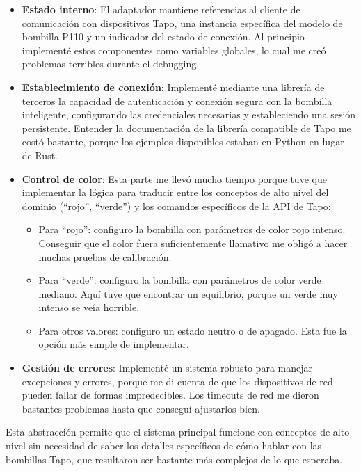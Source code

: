 \begin{itemize}
    \item \textbf{Estado interno}: El adaptador mantiene referencias al cliente de comunicación con dispositivos Tapo, una instancia específica del modelo de bombilla P110 y un indicador del estado de conexión. Al principio implementé estos componentes como variables globales, lo cual me creó problemas terribles durante el debugging.
    
    \item \textbf{Establecimiento de conexión}: Implementé mediante una librería de terceros la capacidad de autenticación y conexión segura con la bombilla inteligente, configurando las credenciales necesarias y estableciendo una sesión persistente. Entender la documentación de la librería compatible de Tapo me costó bastante, porque los ejemplos disponibles estaban en Python en lugar de Rust.
    
    \item \textbf{Control de color}: Esta parte me llevó mucho tiempo porque tuve que implementar la lógica para traducir entre los conceptos de alto nivel del dominio (\textquotedblleft rojo\textquotedblright{}, \textquotedblleft verde\textquotedblright{}) y los comandos específicos de la API de Tapo:
    \begin{itemize}
        \item Para \textquotedblleft rojo\textquotedblright{}: configuro la bombilla con parámetros de color rojo intenso. Conseguir que el color fuera suficientemente llamativo me obligó a hacer muchas pruebas de calibración.
        \item Para \textquotedblleft verde\textquotedblright{}: configuro la bombilla con parámetros de color verde mediano. Aquí tuve que encontrar un equilibrio, porque un verde muy intenso se veía horrible.
        \item Para otros valores: configuro un estado neutro o de apagado. Esta fue la opción más simple de implementar.
    \end{itemize}
    
    \item \textbf{Gestión de errores}: Implementé un sistema robusto para manejar excepciones y errores, porque me di cuenta de que los dispositivos de red pueden fallar de formas impredecibles. Los timeouts de red me dieron bastantes problemas hasta que conseguí ajustarlos bien.
\end{itemize}

Esta abstracción permite que el sistema principal funcione con conceptos de alto nivel sin necesidad de saber los detalles específicos de cómo hablar con las bombillas Tapo, que resultaron ser bastante más complejos de lo que esperaba.

